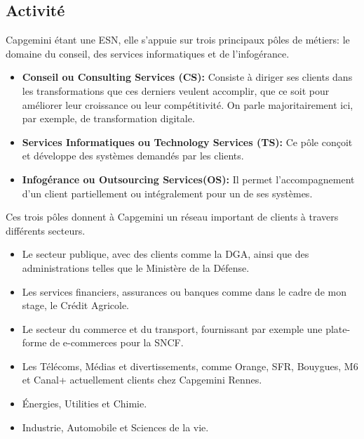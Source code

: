 \documentclass{rapport}
\begin{document}
\subsection{Activité}

Capgemini étant une ESN, elle s'appuie sur trois principaux pôles de métiers: le domaine du conseil, des services informatiques et de l'infogérance.
\begin{itemize}
  \item \textbf{Conseil ou Consulting Services (CS):} Consiste à diriger ses clients dans les transformations que ces derniers veulent accomplir, que ce soit pour améliorer leur croissance ou leur compétitivité. On parle majoritairement ici, par exemple, de transformation digitale.
  
  \item \textbf{Services Informatiques ou Technology Services (TS):} Ce pôle conçoit et développe des systèmes demandés par les clients.
  
  \item \textbf{Infogérance ou Outsourcing Services(OS):} Il permet l'accompagnement d'un client partiellement ou intégralement pour un de ses systèmes. 
\end{itemize}
\vspace{5mm}
Ces trois pôles donnent à Capgemini un réseau important de clients à travers différents secteurs.

\begin{itemize}
  \item Le secteur publique, avec des clients comme la DGA, ainsi que des administrations telles que le Ministère de la Défense.
  
  \item Les services financiers, assurances ou banques comme dans le cadre de mon stage, le Crédit Agricole.
  
  \item Le secteur du commerce et du transport, fournissant par exemple une plate-forme de e-commerces pour la SNCF.
  
  \item Les Télécoms, Médias et divertissements, comme  Orange, SFR, Bouygues, M6 et Canal+ actuellement clients chez Capgemini Rennes.
  
  \item Énergies, Utilities et Chimie.
  
  \item Industrie, Automobile et Sciences de la vie.
\end{itemize}
\end{document}
